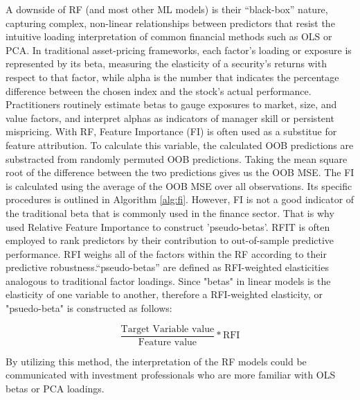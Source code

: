 A downside of RF (and most other ML models) is their “black-box” nature, capturing complex, non-linear relationships between predictors that resist the intuitive loading interpretation of common financial methods such as OLS or PCA. In traditional asset-pricing frameworks, each factor's loading or exposure is represented by its beta, measuring the elasticity of a security's returns with respect to that factor, while alpha is the number that indicates the percentage difference between the chosen index and the stock's actual performance. Practitioners routinely estimate betas to gauge exposures to market, size, and value factors, and interpret alphas as indicators of manager skill or persistent mispricing. With RF, Feature Importance (FI) is often used as a substitue for feature attribution. To calculate this variable, the calculated OOB predictions are substracted from randomly permuted OOB predictions. Taking the mean square root of the difference between the two predictions gives us the OOB MSE. The FI is calculated using the average of the OOB MSE over all observations. Its specific procedures is outlined in Algorithm \ref{alg:fi}. However, FI is not a good indicator of the traditional beta that is commonly used in the finance sector. That is why  used Relative Feature Importance to construct 'pseudo-betas'. RFIT is often employed to rank predictors by their contribution to out-of-sample predictive performance. RFI weighs all of the factors within the RF according to their predictive robustness.“pseudo-betas” are defined as  RFI-weighted elasticities analogous to traditional factor loadings. Since "betas" in linear models is the elasticity of one variable to another, therefore a RFI-weighted elasticity, or "psuedo-beta" is constructed as follows:

\begin{equation}
    \label{eq:psuedo}
    \frac{\text{Target Variable value}}{\text{{Feature value}}}* \text{RFI}
\end{equation}

By utilizing this method, the interpretation of the RF models could be communicated with investment professionals who are more familiar with OLS betas or PCA loadings. 

